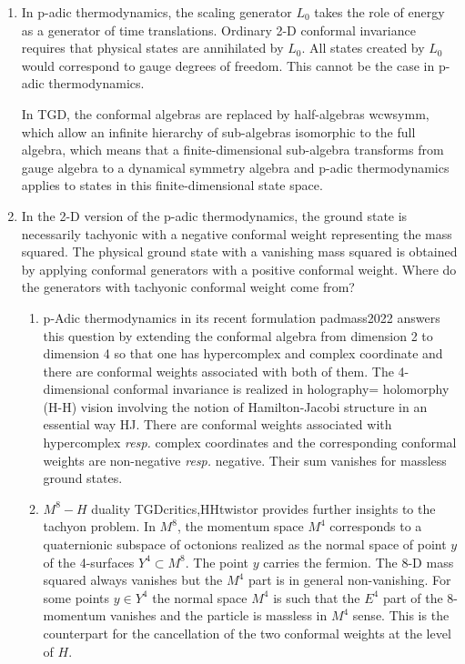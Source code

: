 \documentclass[10pt,epsf]{article}
\begin{document}
\begin{enumerate} 

\item In p-adic thermodynamics,   the scaling generator $L_0$ takes the role of energy as a generator of time translations. Ordinary 2-D conformal invariance requires that physical states are annihilated by $L_0$. All states created by $L_0$ would correspond to gauge degrees of freedom.  This cannot be the case in p-adic thermodynamics.  

In TGD, the conformal algebras are replaced by half-algebras \cite{btart}{wcwsymm}, which allow an  infinite hierarchy of sub-algebras isomorphic to the full algebra, which means that a finite-dimensional  sub-algebra transforms from gauge algebra to a dynamical symmetry algebra and p-adic thermodynamics applies to states in this finite-dimensional state space.

\item  In the 2-D version  of the p-adic thermodynamics, the   ground state is necessarily tachyonic with a negative conformal weight representing the mass squared. The physical  ground state with a vanishing mass squared is obtained by applying conformal generators with a positive conformal weight.  Where do the generators with tachyonic conformal weight come from? 

\begin{enumerate}

\item p-Adic thermodynamics in its  recent formulation \cite{btart}{padmass2022} answers this question by  extending  the conformal algebra  from dimension 2 to  dimension 4 so that one has hypercomplex and complex coordinate and there are  conformal weights associated with both of them. The 4-dimensional conformal invariance  is realized in holography= holomorphy (H-H) vision involving the notion of Hamilton-Jacobi structure in an essential way \cite{brart}{HJ}. There are   conformal weights associated with hypercomplex {\it resp.} complex coordinates and the corresponding conformal weights are non-negative  {\it resp.}  negative. Their sum vanishes for massless ground states.




\item $M^8-H$ duality \cite{btart}{TGDcritics,HHtwistor} provides  further insights to the tachyon problem. In $M^8$, the momentum space  $M^4$ corresponds to a quaternionic subspace of octonions realized as the normal space   of   point  $y$ of  the 4-surfaces $Y^4\subset M^8$. The point $y$  carries the fermion. The 8-D mass squared always vanishes but the $M^4$ part is in general  non-vanishing.   For some points $y\in Y^4$   the normal space $M^4$   is such  that the $E^4$ part of the  8-momentum vanishes and  the particle is massless in $M^4$ sense. This is the counterpart for the cancellation of the two conformal weights at the level of $H$.   

\end{enumerate}

\end{enumerate}
\end{document}
